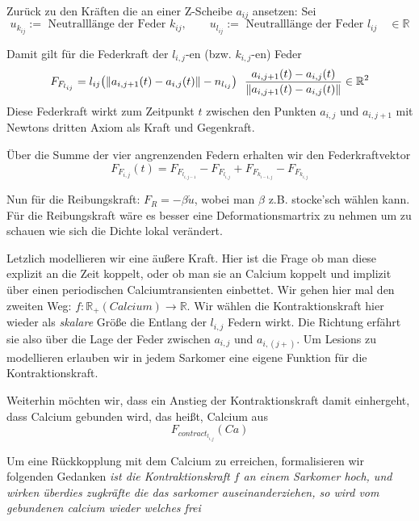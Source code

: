 \newpage

Zurück zu den Kräften die an einer Z-Scheibe $a_{ij}$ ansetzen: Sei
\begin{equation*}
	u_{k_{ij}} := \text{ Neutralllänge der Feder } k_{ij}, \qquad u_{l_{ij}} := \text{ Neutralllänge der Feder } l_{ij} \quad \in \mathbb{R}
\end{equation*}

Damit gilt für die Federkraft der $l_{i,j}$-en (bzw. $k_{i,j}$-en) Feder
\begin{equation*}
	F_{F_{l_{ij}}} = l_{ij} \big(\|a_{i,j+1}(t) - a_{i,j}(t)\| - n_{l_{ij}} \big) \ \ \frac{a_{i,j+1}(t) - a_{i,j}(t)}{\|a_{i,j+1}(t) - a_{i,j}(t)\|} \hfill \in \mathbb{R}^2
\end{equation*}
Diese Federkraft wirkt zum Zeitpunkt $t$ zwischen den Punkten $a_{i,j}$ und $a_{i,j+1}$ mit Newtons dritten Axiom als Kraft und Gegenkraft.


Über die Summe der vier angrenzenden Federn erhalten wir den Federkraftvektor
\begin{equation*}
		F_{F_{i,j}}(t) = F_{F_{l_{i,j-1}}} - F_{F_{l_{i,j}}} + F_{F_{k_{i-1,j}}} - F_{F_{k_{i,j}}}
\end{equation*}

Nun für die Reibungskraft: $F_R = -\beta \dot{u}$, wobei man $\beta$ z.B. stocke'sch wählen kann. 
Für die Reibungskraft wäre es besser eine Deformationsmartrix zu nehmen um zu schauen wie sich die Dichte lokal verändert.

Letzlich modellieren wir eine äußere Kraft. Hier ist die Frage ob man diese explizit an die Zeit koppelt, oder ob man sie an Calcium koppelt und implizit über einen periodischen Calciumtransienten einbettet. Wir gehen hier mal den zweiten Weg: $f: \mathbb{R}_+ (Calcium) \rightarrow \mathbb{R}$. Wir wählen die Kontraktionskraft hier wieder als \textit{skalare} Größe die Entlang der $l_{i,j}$ Federn wirkt. Die Richtung erfährt sie also über die Lage der Feder zwischen $a_{i,j}$ und $a_{i,(j+)}$. Um Lesions zu modellieren erlauben wir in jedem Sarkomer eine eigene Funktion für die Kontraktionskraft.

Weiterhin möchten wir, dass ein Anstieg der Kontraktionskraft damit einhergeht, dass Calcium gebunden wird, das heißt, Calcium aus 
\begin{equation*}
	F_{contract_{l_{i,j}}}(Ca)
\end{equation*}

Um eine Rückkopplung mit dem Calcium zu erreichen, formalisieren wir folgenden Gedanken \textit{ist die Kontraktionskraft $f$ an einem Sarkomer hoch, und wirken überdies zugkräfte die das sarkomer auseinanderziehen, so wird vom gebundenen calcium wieder welches frei}





